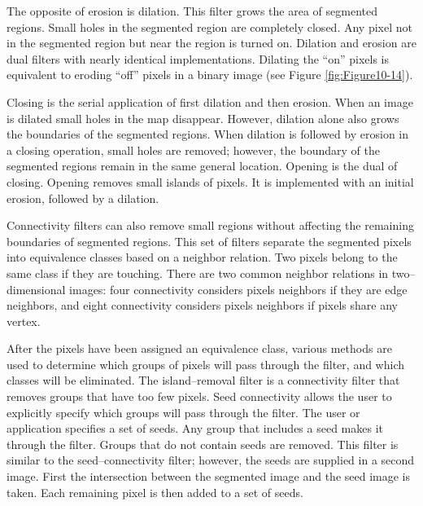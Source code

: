 The opposite of erosion is dilation. This filter grows the area of segmented regions. Small holes in the segmented region are completely closed. Any pixel not in the segmented region but near the region is turned on. Dilation and erosion are dual filters with nearly identical implementations. Dilating the ``on'' pixels is equivalent to eroding ``off'' pixels in a binary image (see Figure \ref{fig:Figure10-14}).

Closing is the serial application of first dilation and then erosion. When an image is dilated small holes in the map disappear. However, dilation alone also grows the boundaries of the segmented regions. When dilation is followed by erosion in a closing operation, small holes are removed; however, the boundary of the segmented regions remain in the same general location. Opening is the dual of closing. Opening removes small islands of pixels. It is implemented with an initial erosion, followed by a dilation.

Connectivity filters can also remove small regions without affecting the remaining boundaries of segmented regions. This set of filters separate the segmented pixels into equivalence classes based on a neighbor relation. Two pixels belong to the same class if they are touching. There are two common neighbor relations in two--dimensional images: four connectivity considers pixels neighbors if they are edge neighbors, and eight connectivity considers pixels neighbors if pixels share any vertex.

After the pixels have been assigned an equivalence class, various methods are used to determine which groups of pixels will pass through the filter, and which classes will be eliminated. The island--removal filter is a connectivity filter that removes groups that have too few pixels. Seed connectivity allows the user to explicitly specify which groups will pass through the filter. The user or application specifies a set of seeds. Any group that includes a seed makes it through the filter. Groups that do not contain seeds are removed. This filter is similar to the seed--connectivity filter; however, the seeds are supplied in a second image. First the intersection between the segmented image and the seed image is taken. Each remaining pixel is then added to a set of seeds.


